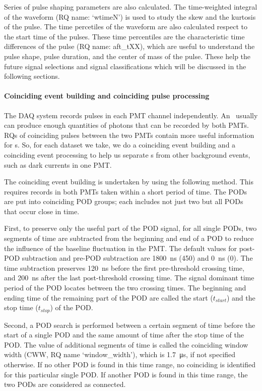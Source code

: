 Series of pulse shaping parameters are also calculated. The time-weighted integral of the waveform (RQ name: `wtimeN') is used to study the skew and the kurtosis of the pulse. The time percetiles of the waveform are also calculated respect to the start time of the pulses. These time percentiles are the characteristic time differences of the pulse (RQ name: aft\_tXX), which are useful to understand the pulse shape, pulse duration, and the center of mass of the pulse. These help the future signal selections and signal classifications which will be discussed in the following sections. 

\paragraph{Coinciding event building and coinciding pulse processing}  \label{par:coinbuild}
The DAQ system records pulses in each PMT channel independently. An \ees\ usually can produce enough quantities of photons that can be recorded by both PMTs. RQs of coinciding pulses between the two PMTs contain more useful information for \ees s. So, for each dataset we take, we do a coinciding event building and a coinciding event processing to help us separate \ees s from other background events, such as dark currents in one PMT. 

The coinciding event building is undertaken by using the following method. This requires records in both PMTs taken within a short period of time. The PODs are put into coinciding POD groups; each includes not just two but all PODs that occur close in time. 

First, to preserve only the useful part of the POD signal, for all single PODs, two segments of time are subtracted from the beginning and end of a POD to reduce the influence of the baseline fluctuation in the PMT. The default values for post-POD subtraction and pre-POD subtraction are \SI{1800}{\ns} (\SI{450}{\sample}) and \SI{0}{\ns} (\SI{0}{\sample}). The time subtraction preserves \SI{120}{\ns} before the first pre-threshold crossing time, and \SI{200}{\ns} after the last post-threshold crossing time. The signal dominant time period of the POD locates between the two crossing times. The beginning and ending time of the remaining part of the POD are called the start ($t_{start}$) and the stop time ($t_{stop}$) of the POD. 

Second, a POD search is performed between a certain segment of time before the start of a single POD and the same amount of time after the stop time of the POD. The value of additional segments of time is called the coinciding window width (CWW, RQ name `window\_width'), which is \SI{1.7}{\us}, if not specified otherwise. If no other POD is found in this time range, no coinciding is identified for this particular single POD. If another POD is found in this time range, the two PODs are considered as connected. 

